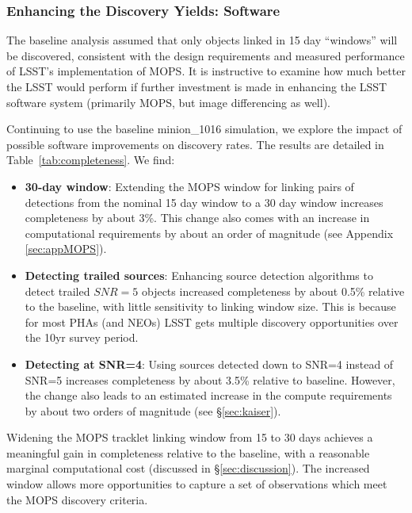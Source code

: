 \subsubsection{Enhancing the Discovery Yields: Software}

The baseline analysis assumed that only objects linked in 15 day ``windows'' will be discovered, consistent with the design requirements and measured performance of LSST's implementation of MOPS. It is instructive to examine how much better the LSST would perform if further investment is made in enhancing the LSST software system (primarily MOPS, but image differencing as well).

Continuing to use the baseline minion\_1016 simulation, we explore the impact of possible software improvements on discovery rates. The results are detailed in Table~\ref{tab:completeness}. We find:

\begin{itemize}
\item {\bf 30-day window}: Extending the MOPS window for linking pairs of detections from the nominal 15 day window to a 30 day window increases completeness by about 3\%. This change also comes with an increase in computational requirements by about an order of magnitude (see Appendix \ref{sec:appMOPS}).

\item {\bf Detecting trailed sources}: Enhancing source detection algorithms to detect trailed $SNR=5$ objects increased completeness by about 0.5\% relative to the baseline, with little sensitivity to linking window size. This is because for most PHAs (and NEOs) LSST gets multiple discovery opportunities over the 10yr survey period.

\item {\bf Detecting at SNR=4}: Using sources detected down to SNR=4 instead of SNR=5 increases completeness by about 3.5\% relative to baseline. However, the change also leads to an estimated increase in the compute requirements by about two orders of magnitude (see \S\ref{sec:kaiser}).

\end{itemize}

Widening the MOPS tracklet linking window from 15 to 30 days achieves a meaningful gain in completeness relative to the baseline, with a reasonable marginal computational cost (discussed in \S\ref{sec:discussion}). The increased window allows more opportunities to capture a set of observations which meet the MOPS discovery criteria.

